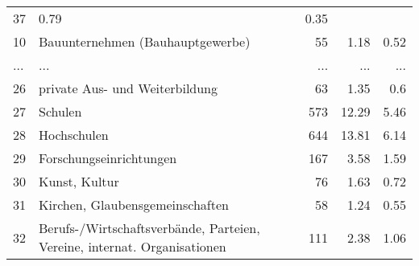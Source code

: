 \begin{longtable}{lXrrr}
          \num{37} &
          \num[round-mode=places,round-precision=2]{0.79} &
          \num[round-mode=places,round-precision=2]{0.35} \\
        10 & \multicolumn{1}{X}{Bauunternehmen (Bauhauptgewerbe)} & %
          \num{55} &
          \num[round-mode=places,round-precision=2]{1.18} &
          \num[round-mode=places,round-precision=2]{0.52} \\
       ... & ... & ... & ... & ... \\
        26 & \multicolumn{1}{X}{private Aus- und Weiterbildung} & %
          \num{63} &
          \num[round-mode=places,round-precision=2]{1.35} &
          \num[round-mode=places,round-precision=2]{0.6} \\

        27 & \multicolumn{1}{X}{Schulen} & %
          \num{573} &
          \num[round-mode=places,round-precision=2]{12.29} &
          \num[round-mode=places,round-precision=2]{5.46} \\

        28 & \multicolumn{1}{X}{Hochschulen} & %
          \num{644} &
          \num[round-mode=places,round-precision=2]{13.81} &
          \num[round-mode=places,round-precision=2]{6.14} \\

        29 & \multicolumn{1}{X}{Forschungseinrichtungen} & %
          \num{167} &
          \num[round-mode=places,round-precision=2]{3.58} &
          \num[round-mode=places,round-precision=2]{1.59} \\

        30 & \multicolumn{1}{X}{Kunst, Kultur} & %
          \num{76} &
          \num[round-mode=places,round-precision=2]{1.63} &
          \num[round-mode=places,round-precision=2]{0.72} \\

        31 & \multicolumn{1}{X}{Kirchen, Glaubensgemeinschaften} & %
          \num{58} &
          \num[round-mode=places,round-precision=2]{1.24} &
          \num[round-mode=places,round-precision=2]{0.55} \\

        32 & \multicolumn{1}{X}{Berufs-/Wirtschaftsverbände, Parteien, Vereine, internat. Organisationen} & %
          \num{111} &
          \num[round-mode=places,round-precision=2]{2.38} &
          \num[round-mode=places,round-precision=2]{1.06} \\


\end{longtable}
